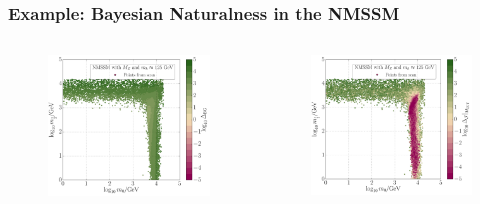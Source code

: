\documentclass[10pt,aspectratio=169]{beamer}
\begin{document}
\begin{frame}
  \frametitle{Example: Bayesian Naturalness in the NMSSM}
  \begin{columns}[t]
    \begin{column}{0.6\textwidth}
      \vspace*{-30pt}
      \begin{columns}[t]
        \begin{column}{0.5\textwidth}
          \begin{figure}
            \centering
            \includegraphics[width=1.1\textwidth]{CNMSSM_BG_mh_m0m12}
          \end{figure}
        \end{column}
        \begin{column}{0.5\textwidth}
          \begin{figure}
            \centering
            \includegraphics[width=1.1\textwidth]{CNMSSM_GUT_J_mh_m0m12}

\end{figure}
\end{column}
\end{columns}
\end{column}
\end{columns}
\end{frame}
\end{document}
